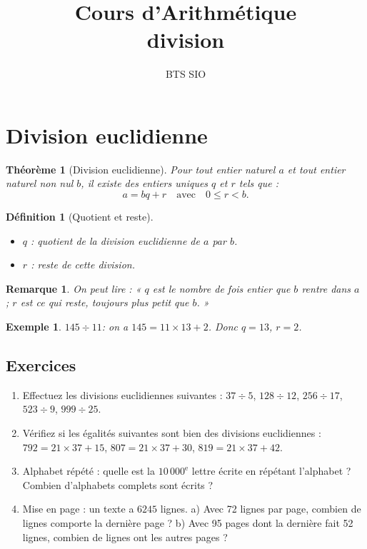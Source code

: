 \documentclass[12pt,a4paper]{article}
\title{Cours d'Arithmétique \\ division}
\author{BTS SIO}
\date{}
\newtheorem{theorem}{Théorème}[section]
\newtheorem{definition}{Définition}[section]
\newtheorem{remark}{Remarque}[section]
\newtheorem{example}{Exemple}[section]
\begin{document}
\maketitle
\tableofcontents

\section{Division euclidienne}

\begin{theorem}[Division euclidienne]
Pour tout entier naturel $a$ et tout entier naturel non nul $b$, il existe des entiers uniques $q$ et $r$ tels que :
\[
a = bq + r \quad \text{avec} \quad 0 \leq r < b.
\]
\end{theorem}

\begin{definition}[Quotient et reste]
\begin{itemize}
    
    \item $q$ : quotient de la division euclidienne de $a$ par $b$.
    \item $r$ : reste de cette division.
\end{itemize}
\end{definition}

\begin{remark}
On peut lire : « $q$ est le nombre de fois entier que $b$ rentre dans $a$ ; $r$ est ce qui reste, toujours plus petit que $b$. »
\end{remark}

\begin{example}
$145 \div 11$: on a $145 = 11 \times 13 + 2$.  
Donc $q = 13$, $r = 2$.
\end{example}

\subsection*{Exercices}
\begin{enumerate}
    \item Effectuez les divisions euclidiennes suivantes :  
    $37 \div 5$, $128 \div 12$, $256 \div 17$, $523 \div 9$, $999 \div 25$.
    \item Vérifiez si les égalités suivantes sont bien des divisions euclidiennes :  
    $792 = 21 \times 37 + 15$,  
    $807 = 21 \times 37 + 30$,  
    $819 = 21 \times 37 + 42$.
    \item Alphabet répété : quelle est la $10\,000^{\text{e}}$ lettre écrite en répétant l’alphabet ?  
    Combien d’alphabets complets sont écrits ?
    \item Mise en page : un texte a $6245$ lignes.  
    a) Avec 72 lignes par page, combien de lignes comporte la dernière page ?  
    b) Avec 95 pages dont la dernière fait 52 lignes, combien de lignes ont les autres pages ?
\end{enumerate}
\end{document}
